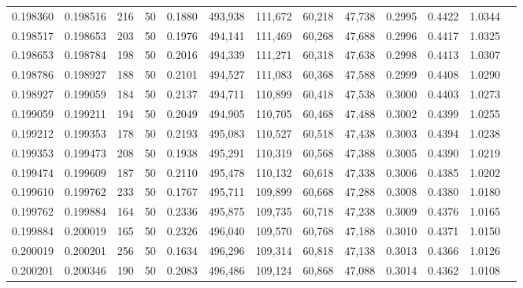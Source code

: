 \begin{tabular}{rrrrrrrrrrrrr}
0.198360 & 0.198516 &   216 &  50 &                                     0.1880 & 493,938 & 111,672 &  60,218 &  47,738 & 0.2995 & 0.4422 & 1.0344 \\
0.198517 & 0.198653 &   203 &  50 &                                     0.1976 & 494,141 & 111,469 &  60,268 &  47,688 & 0.2996 & 0.4417 & 1.0325 \\
0.198653 & 0.198784 &   198 &  50 &                                     0.2016 & 494,339 & 111,271 &  60,318 &  47,638 & 0.2998 & 0.4413 & 1.0307 \\
0.198786 & 0.198927 &   188 &  50 &                                     0.2101 & 494,527 & 111,083 &  60,368 &  47,588 & 0.2999 & 0.4408 & 1.0290 \\
0.198927 & 0.199059 &   184 &  50 &                                     0.2137 & 494,711 & 110,899 &  60,418 &  47,538 & 0.3000 & 0.4403 & 1.0273 \\
0.199059 & 0.199211 &   194 &  50 &                                     0.2049 & 494,905 & 110,705 &  60,468 &  47,488 & 0.3002 & 0.4399 & 1.0255 \\
0.199212 & 0.199353 &   178 &  50 &                                     0.2193 & 495,083 & 110,527 &  60,518 &  47,438 & 0.3003 & 0.4394 & 1.0238 \\
0.199353 & 0.199473 &   208 &  50 &                                     0.1938 & 495,291 & 110,319 &  60,568 &  47,388 & 0.3005 & 0.4390 & 1.0219 \\
0.199474 & 0.199609 &   187 &  50 &                                     0.2110 & 495,478 & 110,132 &  60,618 &  47,338 & 0.3006 & 0.4385 & 1.0202 \\
0.199610 & 0.199762 &   233 &  50 &                                     0.1767 & 495,711 & 109,899 &  60,668 &  47,288 & 0.3008 & 0.4380 & 1.0180 \\
0.199762 & 0.199884 &   164 &  50 &                                     0.2336 & 495,875 & 109,735 &  60,718 &  47,238 & 0.3009 & 0.4376 & 1.0165 \\
0.199884 & 0.200019 &   165 &  50 &                                     0.2326 & 496,040 & 109,570 &  60,768 &  47,188 & 0.3010 & 0.4371 & 1.0150 \\
0.200019 & 0.200201 &   256 &  50 &                                     0.1634 & 496,296 & 109,314 &  60,818 &  47,138 & 0.3013 & 0.4366 & 1.0126 \\
0.200201 & 0.200346 &   190 &  50 &                                     0.2083 & 496,486 & 109,124 &  60,868 &  47,088 & 0.3014 & 0.4362 & 1.0108 \\

\end{tabular}
